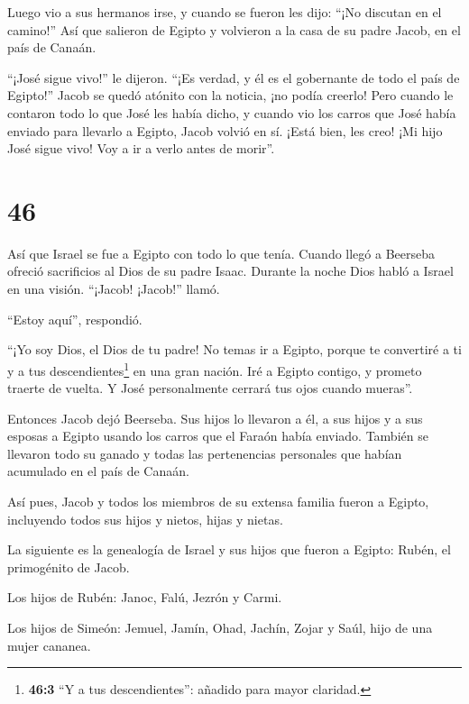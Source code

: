  Luego vio a sus hermanos irse, y cuando se fueron les
dijo: ``¡No discutan en el camino!''  Así que salieron de
Egipto y volvieron a la casa de su padre Jacob, en el país de Canaán.

 ``¡José sigue vivo!'' le dijeron. ``¡Es verdad, y él es el
gobernante de todo el país de Egipto!'' Jacob se quedó atónito con la
noticia, ¡no podía creerlo!  Pero cuando le contaron todo
lo que José les había dicho, y cuando vio los carros que José había
enviado para llevarlo a Egipto, Jacob volvió en sí.  ¡Está
bien, les creo! ¡Mi hijo José sigue vivo! Voy a ir a verlo antes de
morir''.

\hypertarget{section-45}{%
\section{46}\label{section-45}}

 Así que Israel se fue a Egipto con todo lo que tenía.
Cuando llegó a Beerseba ofreció sacrificios al Dios de su padre Isaac.
 Durante la noche Dios habló a Israel en una visión.
``¡Jacob! ¡Jacob!'' llamó.

``Estoy aquí'', respondió.

 ``¡Yo soy Dios, el Dios de tu padre! No temas ir a Egipto,
porque te convertiré a ti y a tus descendientes\footnote{\textbf{46:3}
  ``Y a tus descendientes'': añadido para mayor claridad.} en una gran
nación.  Iré a Egipto contigo, y prometo traerte de vuelta.
Y José personalmente cerrará tus ojos cuando mueras''.

 Entonces Jacob dejó Beerseba. Sus hijos lo llevaron a él, a
sus hijos y a sus esposas a Egipto usando los carros que el Faraón había
enviado.  También se llevaron todo su ganado y todas las
pertenencias personales que habían acumulado en el país de Canaán.

Así pues, Jacob y todos los miembros de su extensa familia fueron a
Egipto,  incluyendo todos sus hijos y nietos, hijas y
nietas.

 La siguiente es la genealogía de Israel y sus hijos que
fueron a Egipto: Rubén, el primogénito de Jacob.

 Los hijos de Rubén: Janoc, Falú, Jezrón y Carmi.

 Los hijos de Simeón: Jemuel, Jamín, Ohad, Jachín, Zojar y
Saúl, hijo de una mujer cananea.

